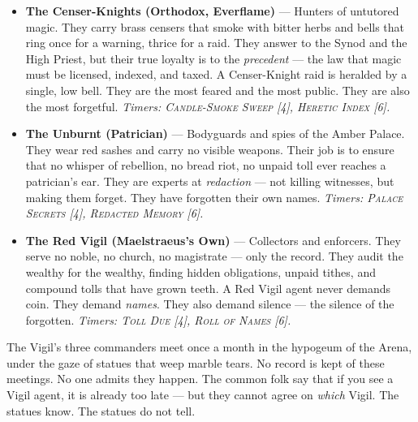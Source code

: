 \begin{itemize}[leftmargin=*]
    \item \textbf{The Censer-Knights (Orthodox, Everflame)} --- Hunters of untutored magic. They carry brass censers that smoke with bitter herbs and bells that ring once for a warning, thrice for a raid. They answer to the Synod and the High Priest, but their true loyalty is to the \emph{precedent} --- the law that magic must be licensed, indexed, and taxed. A Censer-Knight raid is heralded by a single, low bell. They are the most feared and the most public. They are also the most forgetful.  
    \emph{Timers: \textsc{Candle-Smoke Sweep} [4], \textsc{Heretic Index} [6].}

    \item \textbf{The Unburnt (Patrician)} --- Bodyguards and spies of the Amber Palace. They wear red sashes and carry no visible weapons. Their job is to ensure that no whisper of rebellion, no bread riot, no unpaid toll ever reaches a patrician's ear. They are experts at \emph{redaction} --- not killing witnesses, but making them forget. They have forgotten their own names.  
    \emph{Timers: \textsc{Palace Secrets} [4], \textsc{Redacted Memory} [6].}

    \item \textbf{The Red Vigil (Maelstraeus's Own)} --- Collectors and enforcers. They serve no noble, no church, no magistrate --- only the record. They audit the wealthy for the wealthy, finding hidden obligations, unpaid tithes, and compound tolls that have grown teeth. A Red Vigil agent never demands coin. They demand \emph{names}. They also demand silence --- the silence of the forgotten.  
    \emph{Timers: \textsc{Toll Due} [4], \textsc{Roll of Names} [6].}
\end{itemize}

The Vigil's three commanders meet once a month in the hypogeum of the Arena, under the gaze of statues that weep marble tears. No record is kept of these meetings. No one admits they happen. The common folk say that if you see a Vigil agent, it is already too late --- but they cannot agree on \emph{which} Vigil. The statues know. The statues do not tell.

